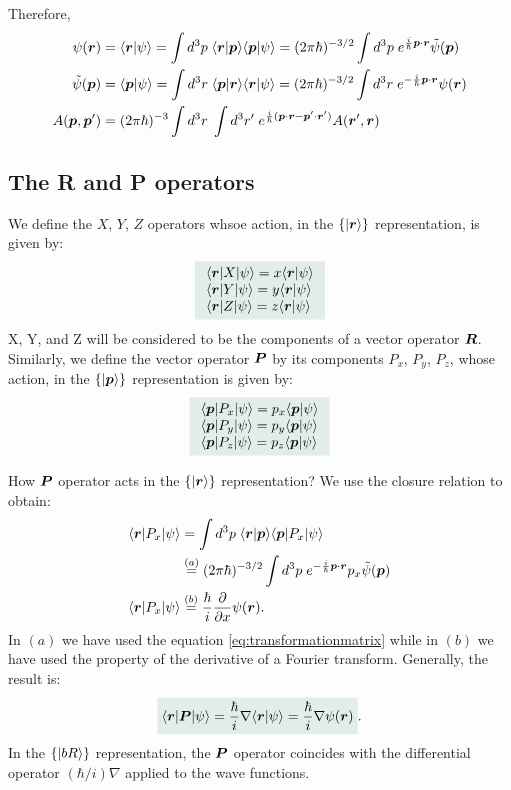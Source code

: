 Therefore,
\begin{align}
    \psi(\bm{r})&=\langle\bm{r}|\psi\rangle=\int d^3p\;\langle\bm{r}|\bm{p}\rangle\langle\bm{p}|\psi\rangle=(2\pi\hbar)^{-3/2}\int d^3p\;e^{\frac{i}{\hbar}\bm{p}\cdot\bm{r}}\tilde{\psi}(\bm{p})\\
    \tilde{\psi}(\bm{p})&=\langle\bm{p}|\psi\rangle=\int d^3r\;\langle\bm{p}|\bm{r}\rangle\langle\bm{r}|\psi\rangle=(2\pi\hbar)^{-3/2}\int d^3r\;e^{-\frac{i}{\hbar}\bm{p}\cdot\bm{r}}\psi(\bm{r})\\
    A(\bm{p},\bm{p}')&=(2\pi\hbar)^{-3}\int d^3r\;\int d^3r'\;e^{\frac{i}{\hbar}(\bm{p}\cdot\bm{r}-\bm{p}'\cdot\bm{r}')}A(\bm{r}',\bm{r})
\end{align}
\subsection{The R and P operators}
We define the $X$, $Y$, $Z$ operators whsoe action, in the $\{|\bm{r}\rangle\}$ representation, is given by:
\begin{align}
    \highlight{
    \begin{array}{l}
        \braket{\bR|X|\psi}=x\braket{\bR|\psi}\\
        \braket{\bR|Y|\psi}=y\braket{\bR|\psi}\\
        \braket{\bR|Z|\psi}=z\braket{\bR|\psi}
    \end{array}}
\end{align}
X, Y, and Z will be considered to be the components of a vector operator $\bm{R}$.
Similarly, we define the vector operator $\bm{P}$ by its components $P_x$, $P_y$, $P_z$, whose action, in the $\{|\bm{p}\rangle\}$ representation is given by:
\begin{align}
    \highlight{
    \begin{array}{l}
        \braket{\bp|P_x|\psi}=p_x\braket{\bp|\psi}\\
        \braket{\bp|P_y|\psi}=p_y\braket{\bp|\psi}\\
        \braket{\bp|P_z|\psi}=p_z\braket{\bp|\psi}
    \end{array}}
\end{align}

How $\bm{P}$ operator acts in the $\{|\bm{r}\rangle\}$ representation?
We use the closure relation to obtain:
\begin{align*}
    \langle\bm{r}|P_x|\psi\rangle&=\int d^3p\;\langle\bm{r}|\bm{p}\rangle\langle\bm{p}|P_x|\psi\rangle\\
    &\stackrel{(a)}{=}(2\pi\hbar)^{-3/2}\int d^3p\;e^{-\frac{i}{\hbar}\bm{p}\cdot\bm{r}}p_x\tilde{\psi}(\bm{p})\\
    \langle\bm{r}|P_x|\psi\rangle&\stackrel{(b)}{=}\frac{\hbar}{i}\frac{\partial}{\partial x}\psi(\bm{r}).
\end{align*}
In $(a)$ we have used the equation \eqref{eq:transformationmatrix} while in $(b)$ we have used the property of the derivative of a Fourier transform.
Generally, the result is:
\begin{align}
    \highlight{\braket{\bR|\BP|\psi}=\frac{\hbar}{i}\nabla\braket{\bR|\psi}=\frac{\hbar}{i}\nabla\psi(\bR)}.
\end{align}
In the $\{|bR\rangle\}$ representation, the $\bm{P}$ operator coincides with the differential operator $(\hbar/i)\nabla$ applied to the wave functions.

